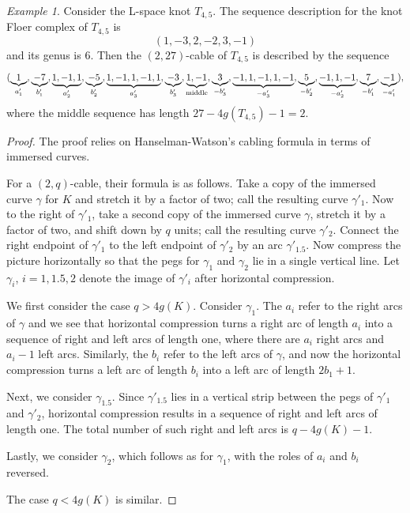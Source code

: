 \documentclass[11pt, reqno]{amsart}
\theoremstyle{definition}
\theoremstyle{remark}
\newtheorem{example}[theorem]{Example}
\numberwithin{equation}{section}
\begin{document}
\begin{example}
Consider the L-space knot $T_{4,5}$. The sequence description for the knot Floer complex of $T_{4,5}$ is $$(1, -3, 2, -2, 3, -1)$$ and its genus is $6$. Then the $(2, 27)$-cable of $T_{4,5}$ is described by the sequence
\[ (\underbrace{1}_{a'_1}, \underbrace{-7}_{b'_1}, \underbrace{1, -1, 1}_{a'_2}, \underbrace{-5}_{b'_2}, \underbrace{1, -1, 1, -1, 1}_{a'_3}, \underbrace{-3}_{b'_3}, \underbrace{1, -1}_{\textup{middle}}, \underbrace{3}_{-b'_3}, \underbrace{-1, 1, -1, 1, -1}_{-a'_3}, \underbrace{5}_{-b'_2}, \underbrace{-1, 1, -1}_{-a'_2}, \underbrace{7}_{-b'_1}, \underbrace{-1}_{-a'_1}), \]
where the middle sequence has length $27-4g(T_{4,5})-1=2$.
\end{example}

\begin{proof}
The proof relies on Hanselman-Watson's cabling formula \cite{Hanselman-Watson:2023} in terms of immersed curves.

For a $(2,q)$-cable, their formula is as follows. Take a copy of the immersed curve $\gamma$ for $K$ and stretch it by a factor of two; call the resulting curve $\gamma'_1$. Now to the right of $\gamma'_1$, take a second copy of the immersed curve $\gamma$, stretch it by a factor of two, and shift down by $q$ units; call the resulting curve $\gamma'_2$. Connect the right endpoint of $\gamma'_1$ to the left endpoint of $\gamma'_2$ by an arc $\gamma'_{1.5}$. Now compress the picture horizontally so that the pegs for $\gamma_1$ and $\gamma_2$ lie in a single vertical line. Let $\gamma_i$, $i=1, 1.5, 2$ denote the image of $\gamma'_i$ after horizontal compression.

We first consider the case $q > 4g(K)$. Consider $\gamma_1$. The $a_i$ refer to the right arcs of $\gamma$ and we see that horizontal compression turns a right arc of length $a_i$ into a sequence of right and left arcs of length one, where there are $a_i$ right arcs and $a_i-1$ left arcs. Similarly, the $b_i$ refer to the left arcs of $\gamma$, and now the horizontal compression turns a left arc of length $b_i$ into a left arc of length $2b_1+1$. 

Next, we consider $\gamma_{1.5}$. Since $\gamma'_{1.5}$ lies in a vertical strip between the pegs of $\gamma'_1$ and $\gamma'_2$, horizontal compression results in a sequence of right and left arcs of length one. The total number of such right and left arcs is $q-4g(K)-1$.

Lastly, we consider $\gamma_2$, which follows as for $\gamma_1$, with the roles of $a_i$ and $b_i$ reversed.

The case $q < 4g(K)$ is similar.
\end{proof}
\end{document}
